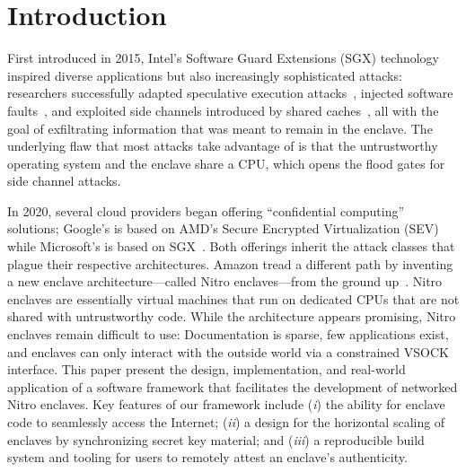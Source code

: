 \section{Introduction}

First introduced in 2015, Intel's Software Guard Extensions (SGX) technology
inspired diverse applications but also increasingly sophisticated attacks:
researchers successfully adapted speculative execution
attacks~\cite{VanBulck2018a}, injected software faults~\cite{Murdock2020a}, and
exploited side channels introduced by shared caches~\cite{Brasser2017a}, all
with the goal of exfiltrating information that was meant to remain in the
enclave.  The underlying flaw that most attacks take advantage of is that the
untrustworthy operating system and the enclave share a CPU, which opens the
flood gates for side channel attacks.

In 2020, several cloud providers began offering ``confidential computing''
solutions; Google's is based on AMD's Secure Encrypted Virtualization
(SEV)~\cite{googlecc} while Microsoft's is based on SGX~\cite{azurecc}.  Both
offerings inherit the attack classes that plague their respective architectures.
Amazon tread a different path by inventing a new enclave architecture---called
Nitro enclaves---from the ground up~\cite{nitro-enclaves}.  Nitro enclaves are
essentially virtual machines that run on dedicated CPUs that are not shared with
untrustworthy code.  While the architecture appears promising, Nitro enclaves
remain difficult to use: Documentation is sparse, few applications exist, and
enclaves can only interact with the outside world via a constrained VSOCK
interface.  This paper present the design, implementation, and real-world
application of a software framework that facilitates the development of
networked Nitro enclaves.  Key features of our framework include
(\emph{i}) the ability for enclave code to seamlessly access the Internet;
(\emph{ii}) a design for the horizontal scaling of enclaves by synchronizing
secret key material; and
(\emph{iii}) a reproducible build system and tooling for users to remotely
attest an enclave's authenticity.

